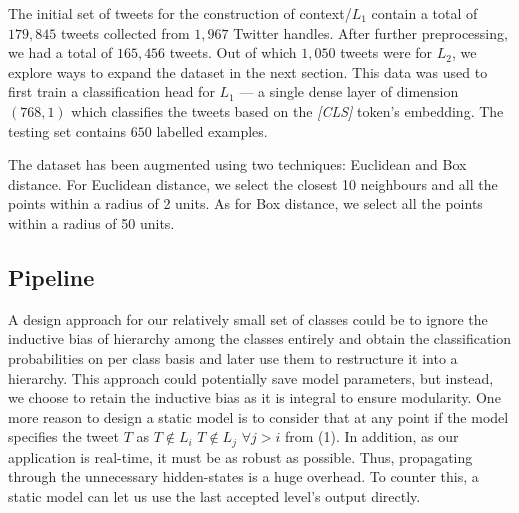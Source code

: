 \documentclass[11pt,a4paper]{article}
\begin{document}
The initial set of tweets for the construction of context/$L_1$ contain a total of $179,845$ tweets collected from $1,967$ Twitter handles. After further preprocessing, we had a total of $165,456$ tweets. Out of which $1,050$ tweets were for $L_2$, we explore ways to expand the dataset in the next section. This data was used to first train a classification head for $L_1$ --- a single dense layer of dimension $(768, 1)$ which classifies the tweets based on the \textit{[CLS]} token's embedding. The testing set contains $650$ labelled examples.

The dataset has been augmented using two techniques: Euclidean and Box distance. For Euclidean distance, we select the closest 10 neighbours and all the points within a radius of 2 units. As for Box distance, we select all the points within a radius of 50 units.


\subsection{Pipeline}
A design approach for our relatively small set of classes could be to ignore the inductive bias of hierarchy among the classes entirely and obtain the classification probabilities on per class basis and later use them to restructure it into a hierarchy. This approach could potentially save model parameters, but instead, we choose to retain the inductive bias as it is integral to ensure modularity. One more reason to design a static model is to consider that at any point if the model specifies the tweet $T$ as $T \notin L_i$  $T \notin L_{j}$ $\forall j > i$ from (1). In addition, as our application is real-time, it must be as robust as possible. Thus, propagating through the unnecessary hidden-states is a huge overhead. To counter this, a static model can let us use the last accepted level's output directly.
\end{document}
